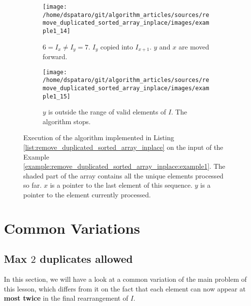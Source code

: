 \begin{figure}
	 \begin{subfigure}[t]{0.49\textwidth}
		\texttt{[image: /home/dspataro/git/algorithm\_articles/sources/remove\_duplicated\_sorted\_array\_inplace/images/example1\_14]}
		\vspace*{-8mm}
		\caption{$6 = I_x \neq I_y = 7$. $I_y$ copied into $I_{x+1}$. $y$ and $x$ are moved forward.}
		\label{fig:remove_duplicated_sorted_array_inplace:example1_6}
	 \end{subfigure}
	 \hfill
	 \begin{subfigure}[t]{0.49\textwidth}
		\texttt{[image: /home/dspataro/git/algorithm\_articles/sources/remove\_duplicated\_sorted\_array\_inplace/images/example1\_15]}
		\vspace*{-8mm}
		\caption{$y$ is outside the range of valid elements of $I$. The algorithm stops.}
		\label{fig:remove_duplicated_sorted_array_inplace:example1_6}
	 \end{subfigure}
\caption{Execution of the algorithm implemented in Listing
 \ref{list:remove_duplicated_sorted_array_inplace} on the input of the Example
 \ref{example:remove_duplicated_sorted_array_inplace:example1}. The shaded part of the array
 contains all the unique elements processed so far. $x$ is a pointer to the last element of this
 sequence. $y$ is a pointer to the element currently processed.}
\label{fig:remove_duplicated_sorted_array_inplace:example1_process}
\end{figure}

\section{Common Variations}
\subsection{Max $2$ duplicates allowed}
In this section, we will have a look at a common variation of the main problem of this lesson, which differs from it on the fact that each element can now appear at \textbf{most twice} in the final rearrangement of $I$.

